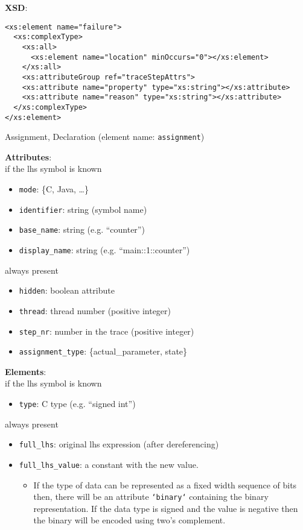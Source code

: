 \documentclass[12pt]{article}
\begin{document}
\noindent\textbf{XSD}:
\begin{verbatim}
<xs:element name="failure">
  <xs:complexType>
    <xs:all>
      <xs:element name="location" minOccurs="0"></xs:element>
    </xs:all>
    <xs:attributeGroup ref="traceStepAttrs">
    <xs:attribute name="property" type="xs:string"></xs:attribute>
    <xs:attribute name="reason" type="xs:string"></xs:attribute>
  </xs:complexType>
</xs:element>
\end{verbatim}


\begin{center}
{\Large Assignment, Declaration} (element name: \texttt{assignment})
\end{center}

\noindent\textbf{Attributes}:\\
if the lhs symbol is known
\begin{itemize}
\item \texttt{mode}: \{C, Java, …\}
\item \texttt{identifier}: string (symbol name)
\item \texttt{base\_name}: string (e.g. ``counter'')
\item \texttt{display\_name}: string (e.g. ``main::1::counter'')
\end{itemize}
always present
\begin{itemize}
\item \texttt{hidden}: boolean attribute
\item \texttt{thread}: thread number (positive integer)
\item \texttt{step\_nr}: number in the trace (positive integer)
\item \texttt{assignment\_type}: \{actual\_parameter, state\}
\end{itemize}

\noindent\textbf{Elements}:\\
if the lhs symbol is known
\begin{itemize}
\item \texttt{type}: C type (e.g. ``signed int'')
\end{itemize}
always present
\begin{itemize}
\item \texttt{full\_lhs}: original lhs expression (after dereferencing)
\item \texttt{full\_lhs\_value}: a constant with the new value.
  \begin{itemize}
    \item If the type of data can be represented as a fixed width sequence of bits
     then, there will be an attribute \texttt{`binary`} containing the binary
     representation. If the data type is signed and the value is negative
     then the binary will be encoded using two's complement.
  \end{itemize}

\end{itemize}
\end{document}
